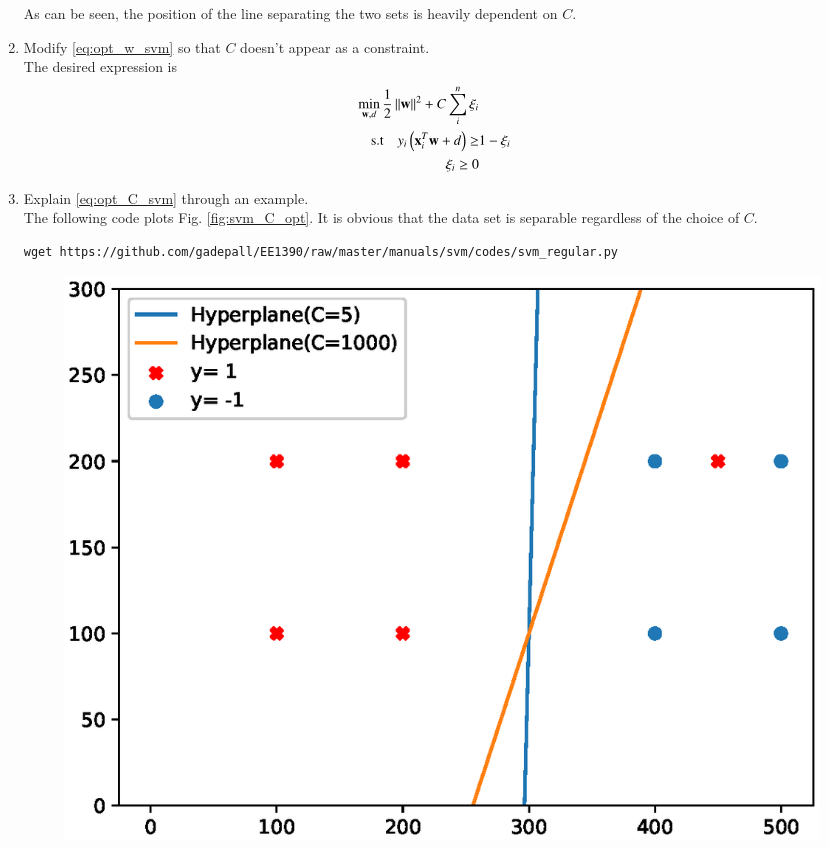 \documentclass[journal,12pt,twocolumn]{IEEEtran}
\renewcommand\thesection{\arabic{section}}
\begin{document}
\begin{enumerate}[label=\thesection.\arabic*,ref=\thesection.\theenumi]
\begin{figure}[!ht]
\caption{}
\label{fig:svm_C_const}
\end{figure}
%
As can be seen, the position of the line separating the two sets is heavily dependent on $C$.
\item 	Modify \eqref{eq:opt_w_svm} so that $C$ doesn't appear as a constraint.
\\
\solution 
The desired expression is
\begin{align}
\label{eq:opt_C_svm}
\min_{\mathbf{w},d}\frac{1}{2}\left\Vert\mathbf{w}\right\Vert^2 + C \sum_{i}^{n}\xi_i
\\
\text{s.t} \quad  y_i\left(\mathbf{x}_i^T\mathbf{w}+d\right) \ge& 1 - \xi_i
\\
\xi_i \ge 0
\end{align}
\item Explain  \eqref{eq:opt_C_svm} through an example.
\\
\solution The following code plots Fig. \eqref{fig:svm_C_opt}.  It is obvious that the data set is separable regardless of the choice of $C$. 
\begin{lstlisting}
wget https://github.com/gadepall/EE1390/raw/master/manuals/svm/codes/svm_regular.py\end{lstlisting}

\begin{figure}[!ht]
\centering
\includegraphics[width=\columnwidth]{./figs/svm_C_opt.eps}
\caption{}
\label{fig:svm_C_opt}
\end{figure}
\end{enumerate}
\end{document}

